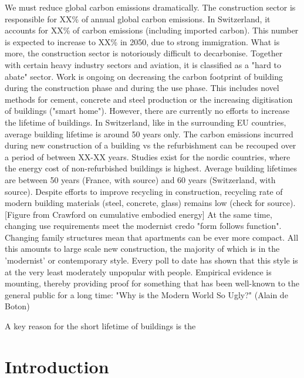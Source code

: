 \documentclass{article}
\begin{document}
We must reduce global carbon emissions dramatically. The construction sector is responsible for XX\% of annual global carbon emissions. In Switzerland, it accounts for XX\% of carbon emissions (including imported carbon). This number is expected to increase to XX\% in 2050, due to strong immigration.
What is more, the construction sector is notoriously difficult to decarbonise. Together with certain heavy industry sectors and aviation, it is classified as a "hard to abate" sector.
Work is ongoing on decreasing the carbon footprint of building during the construction phase and during the use phase. This includes novel methods for cement, concrete and steel production or the increasing digitisation of buildings ("smart home"). However, there are currently no efforts to increase the lifetime of buildings. In Switzerland, like in the surrounding EU countries, average building lifetime is around 50 years only.
The carbon emissions incurred during new construction of a building vs the refurbishment can be recouped over a period of between XX-XX years. Studies exist for the nordic countries, where the energy cost of non-refurbished buildings is highest. Average building lifetimes are between 50 years (France, with source) and 60 years (Switzerland, with source).
Despite efforts to improve recycling in construction, recycling rate of modern building materials (steel, concrete, glass) remains low (check for source).
[Figure from Crawford on cumulative embodied energy]
At the same time, changing use requirements meet the modernist credo "form follows function". Changing family structures mean that apartments can be ever more compact.
All this amounts to large scale new construction, the majority of which is in the 'modernist' or contemporary style.
Every poll to date has shown that this style is at the very least moderately unpopular with people. Empirical evidence is mounting, thereby providing proof for something that has been well-known to the general public for a long time: "Why is the Modern World So Ugly?" (Alain de Boton)




A key reason for the short lifetime of buildings is the 

\tableofcontents

\section{Introduction}
\end{document}
